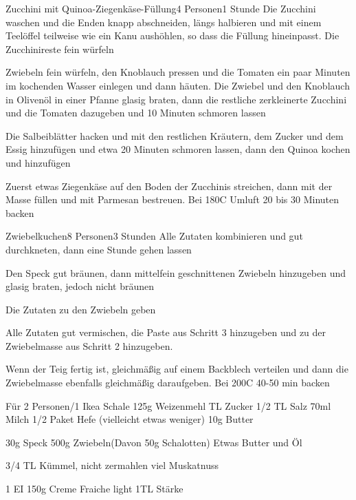 
\begin{recipe}{Zucchini mit Quinoa-Ziegenkäse-Füllung}{4 Personen}{1 Stunde}
Die Zucchini waschen und die Enden knapp abschneiden, längs halbieren und mit einem Teelöffel teilweise wie ein Kanu aushöhlen, so dass die Füllung hineinpasst. 
Die Zucchinireste fein würfeln

Zwiebeln fein würfeln, den Knoblauch pressen und die Tomaten ein paar Minuten im kochenden Wasser einlegen und dann häuten.
Die Zwiebel und den Knoblauch in Olivenöl in einer Pfanne glasig braten, dann die restliche zerkleinerte Zucchini und die Tomaten dazugeben und 10 Minuten schmoren lassen

Die Salbeiblätter hacken und mit den restlichen Kräutern, dem Zucker und dem Essig hinzufügen und etwa 20 Minuten schmoren lassen, dann den Quinoa kochen und hinzufügen

Zuerst etwas Ziegenkäse auf den Boden der Zucchinis streichen, dann mit der Masse füllen und mit Parmesan bestreuen.
Bei 180\0C Umluft 20 bis 30 Minuten backen
\end{recipe}


\begin{recipe}{Zwiebelkuchen}{8 Personen}{3 Stunden}
Alle Zutaten kombinieren und gut durchkneten, dann eine Stunde gehen lassen

Den Speck gut bräunen, dann mittelfein geschnittenen Zwiebeln hinzugeben und glasig braten, jedoch nicht bräunen

Die Zutaten zu den Zwiebeln geben

Alle Zutaten gut vermischen, die Paste aus Schritt 3 hinzugeben und zu der Zwiebelmasse aus Schritt 2 hinzugeben.

\ing[]{}{}
Wenn der Teig fertig ist, gleichmäßig auf einem Backblech verteilen und dann die Zwiebelmasse ebenfalls gleichmäßig daraufgeben. Bei 200\0C 40-50 min backen


Für 2 Personen/1 Ikea Schale
125g Weizenmehl
TL Zucker
1/2 TL Salz
70ml Milch
1/2 Paket Hefe (vielleicht etwas weniger)
10g Butter

30g Speck
500g Zwiebeln(Davon 50g Schalotten)
Etwas Butter und Öl

3/4 TL Kümmel, nicht zermahlen
viel Muskatnuss

1 EI
150g Creme Fraiche light
1TL Stärke
\end{recipe}

